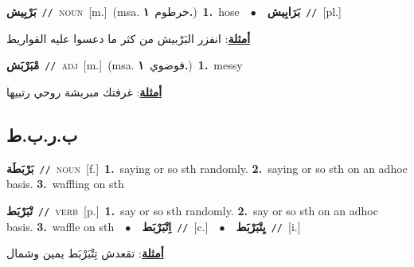 \documentclass[10pt,a4paper,twoside]{article} %
\begin{document}
\begin{multicols}{2}
{\setlength\topsep{0pt}\textbf{\foreignlanguage{arabic}{بَرْبِيش}}\ {\color{gray}\texttt{//}\color{black}}\ \textsc{noun}\ [m.]\ \color{gray}(msa. \foreignlanguage{arabic}{خرطوم}~\foreignlanguage{arabic}{\textbf{١.}})\color{black}\ \textbf{1.}~hose\ \ $\bullet$\ \ \setlength\topsep{0pt}\textbf{\foreignlanguage{arabic}{بَرَابِيش}}\ {\color{gray}\texttt{//}\color{black}}\ [pl.]\  \begin{flushright}\color{gray}\foreignlanguage{arabic}{\textbf{\underline{\foreignlanguage{arabic}{أمثلة}}}: انفزر البَرْبيش من كثر ما دعسوا عليه القواريط}\end{flushright}\color{black}} \vspace{2mm}

{\setlength\topsep{0pt}\textbf{\foreignlanguage{arabic}{مْبَرْبَش}}\ {\color{gray}\texttt{//}\color{black}}\ \textsc{adj}\ [m.]\ \color{gray}(msa. \foreignlanguage{arabic}{فوضوي}~\foreignlanguage{arabic}{\textbf{١.}})\color{black}\ \textbf{1.}~messy\  \begin{flushright}\color{gray}\foreignlanguage{arabic}{\textbf{\underline{\foreignlanguage{arabic}{أمثلة}}}: غرفتك مبربشة روحي رتبيها}\end{flushright}\color{black}} \vspace{2mm}

\vspace{-3mm}
\subsection*{\color{blue}\foreignlanguage{arabic}{ب.ر.ب.ط}\color{blue}{}} 

{\setlength\topsep{0pt}\textbf{\foreignlanguage{arabic}{بَرْبَطَة}}\ {\color{gray}\texttt{//}\color{black}}\ \textsc{noun}\ [f.]\ \textbf{1.}~saying or so sth randomly.  \textbf{2.}~saying or so sth on an adhoc basis.  \textbf{3.}~waffling on sth\ } \vspace{2mm}

{\setlength\topsep{0pt}\textbf{\foreignlanguage{arabic}{تْبَرْبَط}}\ {\color{gray}\texttt{//}\color{black}}\ \textsc{verb}\ [p.]\ \textbf{1.}~say or so sth randomly.  \textbf{2.}~say or so sth on an adhoc basis.  \textbf{3.}~waffle on sth\ \ $\bullet$\ \ \setlength\topsep{0pt}\textbf{\foreignlanguage{arabic}{اِتْبَرْبَط}}\ {\color{gray}\texttt{//}\color{black}}\ [c.]\ \ $\bullet$\ \ \setlength\topsep{0pt}\textbf{\foreignlanguage{arabic}{يِتْبَرْبَط}}\ {\color{gray}\texttt{//}\color{black}}\ [i.]\  \begin{flushright}\color{gray}\foreignlanguage{arabic}{\textbf{\underline{\foreignlanguage{arabic}{أمثلة}}}: تقعدش تِتْبَرْبَط يمين وشمال}\end{flushright}\color{black}} \vspace{2mm}


\end{multicols}
\end{document}
